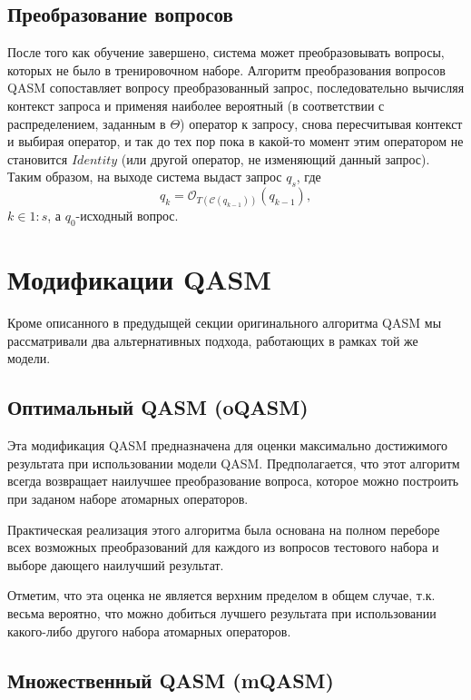 \documentclass{article}
\begin{document}
\subsection{Преобразование вопросов}
После того как обучение завершено, система может преобразовывать вопросы, которых не было
в тренировочном наборе.
Алгоритм преобразования вопросов QASM \cite{qa:radev:qasm}
сопоставляет вопросу преобразованный запрос,
последовательно вычисляя контекст запроса и применяя наиболее вероятный
(в соответствии с распределением, заданным в $\Theta$)
оператор к запросу,
снова пересчитывая контекст и выбирая оператор, и так
до тех пор пока в какой-то момент этим оператором не становится $Identity$
(или другой оператор, не изменяющий данный запрос).
Таким образом, на выходе система выдаст запрос $q_s$, где
$$q_k=\mathcal{O}_{T(\mathcal{C}(q_{k-1}))}(q_{k-1}),$$
$k\in 1:s$, а $q_0$-исходный вопрос.



\section{Модификации QASM} 

Кроме описанного в предудыщей секции оригинального алгоритма QASM 
мы рассматривали два альтернативных подхода, работающих в рамках 
той же модели.

\subsection{Оптимальный QASM (oQASM)}

Эта модификация QASM предназначена для оценки  максимально достижимого
результата при использовании модели QASM. Предполагается, 
что этот алгоритм всегда возвращает наилучшее преобразование 
вопроса, которое можно построить при заданом наборе атомарных
операторов.

Практическая реализация этого алгоритма была основана на 
полном переборе всех возможных преобразований
для каждого из вопросов тестового набора и 
выборе дающего наилучший результат.

Отметим, что эта оценка не является верхним пределом в общем случае,
т.к. весьма вероятно, что можно добиться лучшего результата
при использовании какого-либо другого набора атомарных операторов.

\subsection{Множественный QASM (mQASM)}\label{mqasm}
\end{document}
